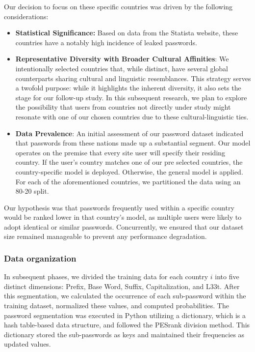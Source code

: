 \documentclass[5p,twocolumn]{elsarticle}
\begin{document}
Our decision to focus on these specific countries was driven by the following considerations:
 \begin{itemize}
     \item \textbf{Statistical Significance:} Based on data from the Statista website, these countries have a notably high incidence of leaked passwords.
 \end{itemize}
\begin{itemize}
    \item \textbf{Representative Diversity with Broader Cultural Affinities}: We intentionally selected countries that, while distinct, have several global counterparts sharing cultural and linguistic resemblances. This strategy serves a twofold purpose: while it highlights the inherent diversity, it also sets the stage for our follow-up study. In this subsequent research, we plan to explore the possibility that users from countries not directly under study might resonate with one of our chosen countries due to these cultural-linguistic ties.
\end{itemize}
\begin{itemize}
    \item \textbf{Data Prevalence}: An initial assessment of our password dataset indicated that passwords from these nations made up a substantial segment. Our model operates on the premise that every site user will specify their residing country. If the user's country matches one of our pre selected countries, the country-specific model is deployed. Otherwise, the general model is applied. For each of the aforementioned countries, we partitioned the data using an 80-20 split. 
\end{itemize}

Our hypothesis was that passwords frequently used within a specific country would be ranked lower in that country's model, as multiple users were likely to adopt identical or similar passwords. Concurrently, we ensured that our dataset size remained manageable to prevent any performance degradation. 

\subsubsection{\textbf{Data organization}}
In subsequent phases, we divided the training data for each country \(i\) into five distinct dimensions: Prefix, Base Word, Suffix, Capitalization, and L33t. After this segmentation, we calculated the occurrence of each sub-password within the training dataset, normalized these values, and computed probabilities. The password segmentation was executed in Python utilizing a dictionary, which is a hash table-based data structure, and followed the PESrank division method. This dictionary stored the sub-passwords as keys and maintained their frequencies as updated values.
\end{document}
